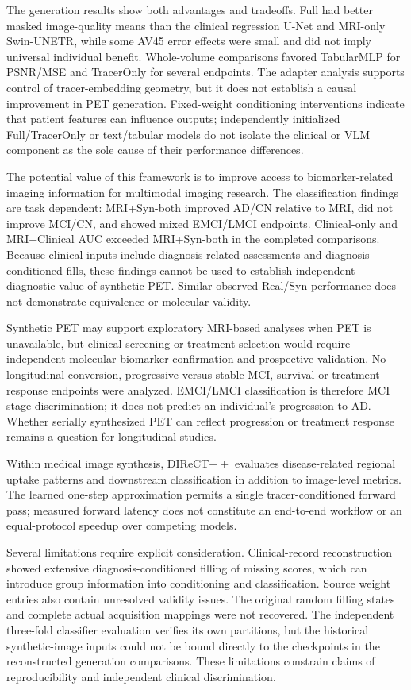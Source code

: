 \documentclass{article}
\begin{document}
The generation results show both advantages and tradeoffs. Full had better masked image-quality means than the clinical regression U-Net and MRI-only Swin-UNETR, while some AV45 error effects were small and did not imply universal individual benefit. Whole-volume comparisons favored TabularMLP for PSNR/MSE and TracerOnly for several endpoints. The adapter analysis supports control of tracer-embedding geometry, but it does not establish a causal improvement in PET generation. Fixed-weight conditioning interventions indicate that patient features can influence outputs; independently initialized Full/TracerOnly or text/tabular models do not isolate the clinical or VLM component as the sole cause of their performance differences.

The potential value of this framework is to improve access to biomarker-related imaging information for multimodal imaging research. The classification findings are task dependent: MRI+Syn-both improved AD/CN relative to MRI, did not improve MCI/CN, and showed mixed EMCI/LMCI endpoints. Clinical-only and MRI+Clinical AUC exceeded MRI+Syn-both in the completed comparisons. Because clinical inputs include diagnosis-related assessments and diagnosis-conditioned fills, these findings cannot be used to establish independent diagnostic value of synthetic PET. Similar observed Real/Syn performance does not demonstrate equivalence or molecular validity.

Synthetic PET may support exploratory MRI-based analyses when PET is unavailable, but clinical screening or treatment selection would require independent molecular biomarker confirmation and prospective validation. No longitudinal conversion, progressive-versus-stable MCI, survival or treatment-response endpoints were analyzed. EMCI/LMCI classification is therefore MCI stage discrimination; it does not predict an individual's progression to AD. Whether serially synthesized PET can reflect progression or treatment response remains a question for longitudinal studies.

Within medical image synthesis, DIReCT$++$ evaluates disease-related regional uptake patterns and downstream classification in addition to image-level metrics. The learned one-step approximation permits a single tracer-conditioned forward pass; measured forward latency does not constitute an end-to-end workflow or an equal-protocol speedup over competing models.

Several limitations require explicit consideration. Clinical-record reconstruction showed extensive diagnosis-conditioned filling of missing scores, which can introduce group information into conditioning and classification. Source weight entries also contain unresolved validity issues. The original random filling states and complete actual acquisition mappings were not recovered. The independent three-fold classifier evaluation verifies its own partitions, but the historical synthetic-image inputs could not be bound directly to the checkpoints in the reconstructed generation comparisons. These limitations constrain claims of reproducibility and independent clinical discrimination.
\end{document}
